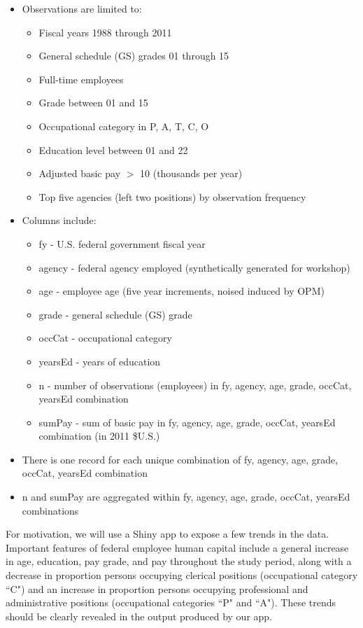 \documentclass[10pt, letterpaper]{article}
\begin{document}
\begin{spacing}{1.0}
\begin{itemize}
    \item Observations are limited to:
    \begin{itemize}[noitemsep]
        \item Fiscal years 1988 through 2011
        \item General schedule (GS) grades 01 through 15
        \item Full-time employees
        \item Grade between 01 and 15
        \item Occupational category in {P, A, T, C, O}
        \item Education level between 01 and 22
        \item Adjusted basic pay $>$ 10 (thousands per year)
        \item Top five agencies (left two positions) by observation frequency
    \end{itemize}
    \item Columns include:
    \begin{itemize}[noitemsep]
        \item fy - U.S. federal government fiscal year
        \item agency - federal agency employed (synthetically generated for workshop)
        \item age - employee age (five year increments, noised induced by OPM)
        \item grade - general schedule (GS) grade
        \item occCat - occupational category 
        \item yearsEd - years of education
        \item n - number of observations (employees) in fy, agency, age, grade, occCat, yearsEd combination
        \item sumPay - sum of basic pay in fy, agency, age, grade, occCat, yearsEd combination (in 2011 \$U.S.)
    \end{itemize}
    \item There is one record for each unique combination of fy, agency, age, grade, occCat, yearsEd combination
    \item n and sumPay are aggregated within fy, agency, age, grade, occCat, yearsEd combinations
\end{itemize}

For motivation, we will use a Shiny app to expose a few trends in the data.  Important features of federal employee human capital include a general increase in age, education, pay grade, and pay throughout the study period, along with a decrease in proportion persons occupying clerical positions (occupational category ``C") and an increase in proportion persons occupying professional and administrative positions (occupational categories ``P" and ``A").  These trends should be clearly revealed in the output produced by our app.\\


\end{spacing}
\end{document}
